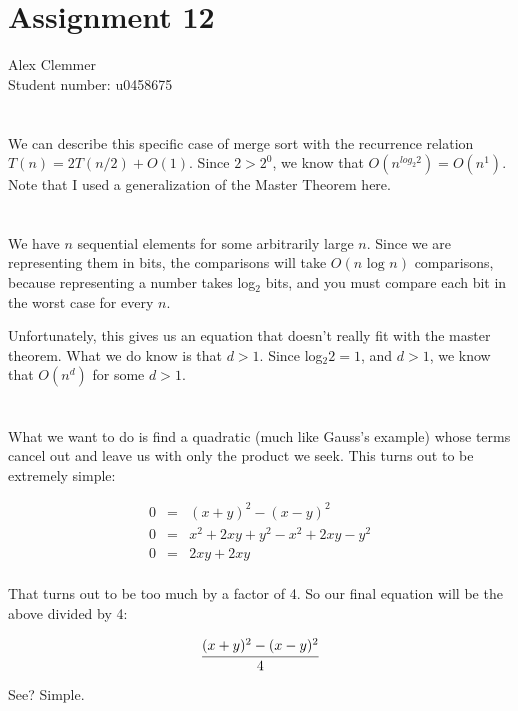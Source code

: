 \documentclass[a4paper]{article}
\begin{document}
\section*{Assignment 12}
Alex Clemmer\\
Student number: u0458675

\section{}

We can describe this specific case of merge sort with the recurrence relation $T(n) = 2T(n/2) + O(1)$. Since $2 > 2^0$, we know that $O(n^{log_2 2}) = O(n^1)$. Note that I used a generalization of the Master Theorem here.

\section{}

We have $n$ sequential elements for some arbitrarily large $n$. Since we are representing them in bits, the comparisons will take $O(n \mbox{ log } n)$ comparisons, because representing a number takes log$_2$ bits, and you must compare each bit in the worst case for every $n$.

Unfortunately, this gives us an equation that doesn't really fit with the master theorem. What we do know is that $d > 1$. Since log$_2 2 = 1$, and $d > 1$, we know that $O(n^{d})$ for some $d > 1$.

\section{}

What we want to do is find a quadratic (much like Gauss's example) whose terms cancel out and leave us with only the product we seek. This turns out to be extremely simple:

\begin{equation*}
\begin{array}{rcl}
0 & = & (x+y)^2 - (x-y)^2 \\
0 & = & x^2 + 2xy + y^2 - x^2 + 2xy - y^2 \\
0 & = & 2xy + 2xy \\
\end{array}
\end{equation*}

That turns out to be too much by a factor of 4. So our final equation will be the above divided by 4:

\begin{equation}
\cfrac{(x+y)^2 - (x-y)^2}{4} \\
\end{equation}

See? Simple.
\end{document}
